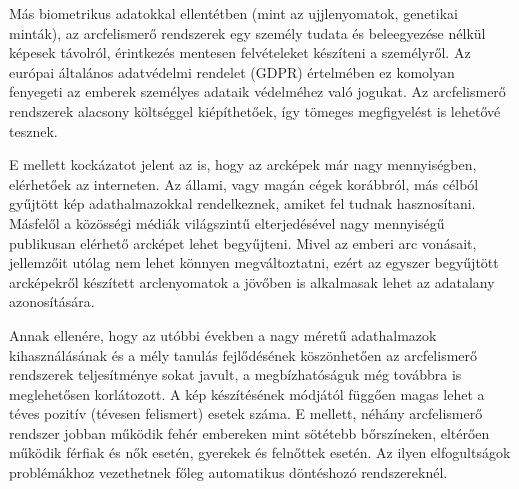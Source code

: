 Más biometrikus adatokkal ellentétben (mint az ujjlenyomatok, genetikai minták), az arcfelismerő rendszerek egy személy tudata és beleegyezése nélkül képesek távolról, érintkezés mentesen felvételeket készíteni a személyről. Az európai általános adatvédelmi rendelet (GDPR) értelmében ez komolyan fenyegeti az emberek személyes adataik védelméhez való jogukat. Az arcfelismerő rendszerek alacsony költséggel kiépíthetőek, így tömeges megfigyelést is lehetővé tesznek. 

E mellett kockázatot jelent az is, hogy az arcképek már nagy mennyiségben, elérhetőek az interneten. Az állami, vagy magán cégek korábbról, más célból gyűjtött kép adathalmazokkal rendelkeznek, amiket fel tudnak hasznosítani. Másfelől a közösségi médiák világszintű elterjedésével nagy mennyiségű publikusan elérhető arcképet lehet begyűjteni. Mivel az emberi arc vonásait, jellemzőit utólag nem lehet könnyen megváltoztatni, ezért az egyszer begyűjtött arcképekről készített arclenyomatok a jövőben is alkalmasak lehet az adatalany azonosítására.

Annak ellenére, hogy az utóbbi években a nagy méretű adathalmazok kihasználásának és a mély tanulás fejlődésének köszönhetően az arcfelismerő rendszerek teljesítménye sokat javult, a megbízhatóságuk még továbbra is meglehetősen korlátozott. A kép készítésének módjától függően magas lehet a téves pozitív (tévesen felismert) esetek száma. E mellett, néhány arcfelismerő rendszer jobban működik fehér embereken mint sötétebb bőrszíneken, eltérően működik férfiak és nők esetén, gyerekek és felnőttek esetén. Az ilyen elfogultságok problémákhoz vezethetnek főleg automatikus döntéshozó rendszereknél.




